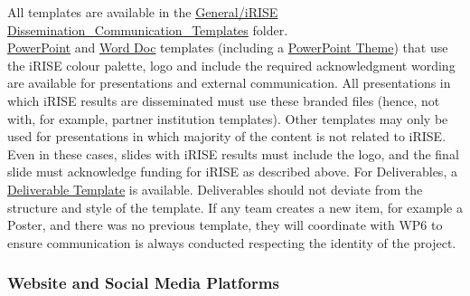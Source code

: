\documentclass[
]{article}
\begin{document}
All templates are available in the \href{https://charitede.sharepoint.com/:f:/r/sites/iRISE/Shared\%20Documents/General/iRISE\%20Dissemination_Communication_Templates/Templates?csf=1\&web=1\&e=P8QVBa}{General/iRISE Dissemination\_Communication\_Templates} folder.\\
\href{https://charitede.sharepoint.com/:p:/r/sites/iRISE/Shared\%20Documents/General/iRISE\%20Dissemination_Communication_Templates/Templates/PPT\%20Template.pptx?d=w197f096e83fa4576a6f82bdcd51489b2\&csf=1\&web=1\&e=MREwQ4}{PowerPoint} and \href{https://charitede.sharepoint.com/:w:/r/sites/iRISE/Shared\%20Documents/General/iRISE\%20Dissemination_Communication_Templates/Templates/DocTemplate.docx?d=wcb083ece13604791b342b0bb693fe067\&csf=1\&web=1\&e=f61QPR}{Word Doc} templates (including a \href{https://charitede.sharepoint.com/:u:/r/sites/iRISE/Shared\%20Documents/Branding\%20and\%20Website/iRISE.thmx?csf=1\&web=1\&e=fyKrZL}{PowerPoint Theme}) that use the iRISE colour palette, logo and include the required acknowledgment wording are available for presentations and external communication. All presentations in which iRISE results are disseminated must use these branded files (hence, not with, for example, partner institution templates). Other templates may only be used for presentations in which majority of the content is not related to iRISE. Even in these cases, slides with iRISE results must include the logo, and the final slide must acknowledge funding for iRISE as described above. For Deliverables, a \href{https://charitede.sharepoint.com/:w:/r/sites/iRISE/Shared\%20Documents/General/iRISE\%20Dissemination_Communication_Templates/Templates/DeliverableTemplate.docx?d=w4ec2474158ab425f86655df0f923297d\&csf=1\&web=1\&e=drgFm9}{Deliverable Template} is available. Deliverables should not deviate from the structure and style of the template. If any team creates a new item, for example a Poster, and there was no previous template, they will coordinate with WP6 to ensure communication is always conducted respecting the identity of the project.

\hypertarget{website-and-social-media-platforms}{%
\subsubsection{Website and Social Media Platforms}\label{website-and-social-media-platforms}}
\end{document}
